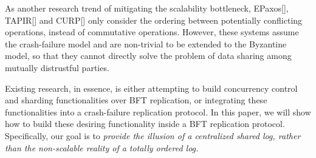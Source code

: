 As another research trend of mitigating the scalability bottleneck, 
EPaxos[], TAPIR[] and CURP[] only consider the ordering between potentially conflicting operations,
instead of commutative operations.
However, these systems assume the crash-failure model and are non-trivial to be extended to the Byzantine model,
so that they cannot directly solve the problem of data sharing among mutually distrustful parties.

Existing research, in essence, is either attempting to build concurrency control and sharding
functionalities over BFT replication, or integrating these functionalities into a crash-failure replication protocol.
In this paper, we will show how to build these desiring functionality inside a BFT replication protocol.
Specifically, our goal is to \textit{provide the illusion of a centralized shared
log, rather than the non-scalable reality of a totally ordered log.}
